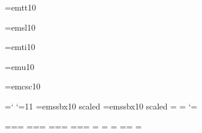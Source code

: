 \font\tentt=emtt10 %


\font\tensl=emsl10 %

\font\tenit=emti10 %


\font\tenuit=emu10


\font\tensmc=emcsc10


\chardef\atcode=\catcode`\@	%
\catcode`\@=11			%
\ifx\tugstyloaded@\relax
\font\seventeenssb=emssbx10 scaled 
\font\twelvessb=emssbx10 scaled 
\textfont\sectitlefam=\seventeenssb 
\scriptfont\sectitlefam=\twelvessb
\fi
\catcode`\@=\atcode		%



\let\preloaded=\undefined %

\skewchar{} \skewchar{} \skewchar{}
\skewchar{} \skewchar{} \skewchar{}




=\tenrm {}=\sevenrm {}=\fiverm
=\teni {}=\seveni {}=\fivei
=\tensy {}=\sevensy {}=\fivesy
{}=\tenex {}=\tenex {}=\tenex
\textfont\itfam=\tenit
\textfont\slfam=\tensl
\textfont\bffam=\tenbf 
        \scriptfont\bffam=\sevenbf \scriptscriptfont\bffam=\fivebf
\textfont\ttfam=\tentt

